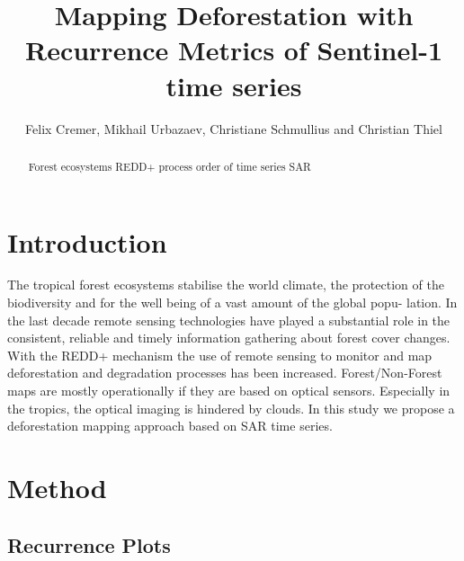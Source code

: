 \documentclass{article}
\title{Mapping Deforestation with Recurrence Metrics of Sentinel-1 time series}
\author{Felix Cremer, Mikhail Urbazaev, Christiane Schmullius and Christian Thiel}
\begin{document}
\maketitle
\begin{abstract}
  Forest ecosystems
  REDD+ process
  order of time series
  SAR

%
\end{abstract}
\section{Introduction}
The tropical forest ecosystems stabilise the world climate\cite{}, the protection of the biodiversity \cite{} and
for the well being of a vast amount of the global popu-
lation\cite{}.
 In the last decade remote sensing technologies have
played a substantial role in the consistent, reliable and timely
information gathering about forest cover changes. With the
REDD+ mechanism the use of remote sensing to monitor
and map deforestation and degradation processes has been
increased. Forest/Non-Forest maps are mostly operationally if
they are based on optical sensors. Especially in the tropics,
the optical imaging is hindered by clouds. In this study we
 propose a deforestation mapping approach based on SAR time
series.

\section{Method}

\subsection{Recurrence Plots}
\end{document}
